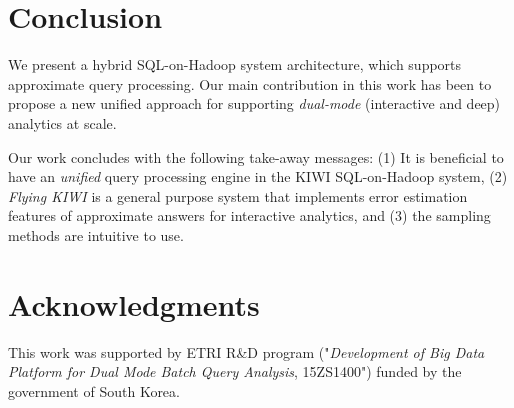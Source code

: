 \documentclass{sig-alternate-05-2015}
\begin{document}

\section{Conclusion}
We present a hybrid SQL-on-Hadoop system architecture, which supports approximate query processing. 
Our main contribution in this work has been to propose a new unified approach for supporting \textit{dual-mode} (interactive and deep) analytics at scale.

Our work concludes with the following take-away messages:
(1) It is beneficial to have an \textit{unified} query processing engine in the KIWI SQL-on-Hadoop system,
(2) \textit{Flying KIWI} is a general purpose system that implements error estimation features of approximate answers for interactive analytics, and (3) the sampling methods are intuitive to use.

\section*{Acknowledgments}
This work was supported by ETRI R\&D program ("\textit{Development of Big Data Platform for Dual Mode Batch Query Analysis}, 15ZS1400") funded by the government of South Korea.














































\small{


}
\end{document}
